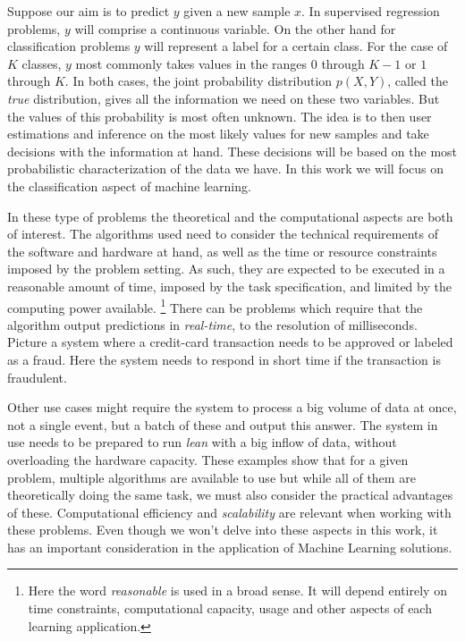 Suppose our aim is to predict $y$ given a new sample $x$. In supervised regression problems, $y$ will comprise a continuous variable. On the other hand for classification problems $y$ will represent a label for a certain class. For the case of $K$ classes, $y$ most commonly takes values in the ranges $0$ through $K-1$  or $1$ through $K$. In both cases, the joint probability distribution $p(X, Y)$, called the \textit{true} distribution, gives all the information we need on these two variables. But the values of this probability is most often unknown. The idea is to then user estimations and inference on the most likely values for new samples and take decisions with the information at hand. These decisions will be based on the most probabilistic characterization of the data we have. In this work we will focus on the classification aspect of machine learning.

In these type of problems the theoretical and the computational aspects are both of interest. The algorithms used need to consider the technical requirements of the software and hardware at hand, as well as the time or resource constraints imposed by the problem setting. As such, they are expected to be executed in a reasonable amount of time, imposed by the task specification, and limited by the computing power available. \footnote{Here the word \textit{reasonable} is used in a broad sense. It will depend entirely on time constraints, computational capacity, usage and other aspects of each learning application.} There can be  problems which require that the algorithm output predictions in \textit{real-time}, to the resolution of milliseconds. Picture a system where a credit-card transaction needs to be approved or labeled as a fraud. Here the system needs to respond in short time if the transaction is fraudulent.

Other use cases might require the system to process a big volume of data at once, not a single event, but a batch of these and output this answer. The system in use needs to be prepared to run \textit{lean} with a big inflow of data, without overloading the hardware capacity.  These examples show that for a given problem, multiple algorithms are available to use but while all of them are theoretically doing the same task, we must also consider the practical advantages of these. Computational efficiency and \textit{scalability} are relevant when working with these problems. Even though we won't delve into these aspects in this work, it has an important consideration in the application of Machine Learning solutions.


